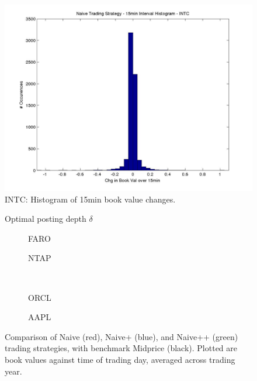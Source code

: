 \begin{figure}
  \includegraphics[width=\textwidth]{Figs/fig-INTC-15min-hist}
  \caption{INTC: Histogram of 15min book value changes.}
\end{figure}

\begin{figure}
  \centering
  \setlength{} 
  \setlength{}
  
  \caption{Optimal posting depth $\delta$}
  \label{fig:126a}
\end{figure}

\begin{figure}
\centering
\begin{subfigure}{.35\linewidth}
  \centering
  \setlength\figureheight{\linewidth} 
  \setlength\figurewidth{\linewidth}
  
  \caption{FARO}
\end{subfigure}%
\hfil%
\begin{subfigure}{.35\linewidth}
  \centering
  \setlength\figureheight{\linewidth}
  \setlength\figurewidth{\linewidth}
   
  \caption{NTAP}
\end{subfigure}\\
\vspace{1cm}
\begin{subfigure}{.35\linewidth}
  \centering
  \setlength\figureheight{\linewidth} 
  \setlength\figurewidth{\linewidth}
  
  \caption{ORCL}
\end{subfigure}%
\hfil%
\begin{subfigure}{.35\linewidth}
  \centering
  \setlength\figureheight{\linewidth}
  \setlength\figurewidth{\linewidth}
   
  \caption{AAPL}
\end{subfigure}%
  \caption{Comparison of Naive (red), Naive+ (blue), and Naive++ (green) trading strategies, with benchmark Midprice (black). Plotted are book values against time of trading day, averaged across trading year.}
  \label{fig:comp}
\end{figure}

